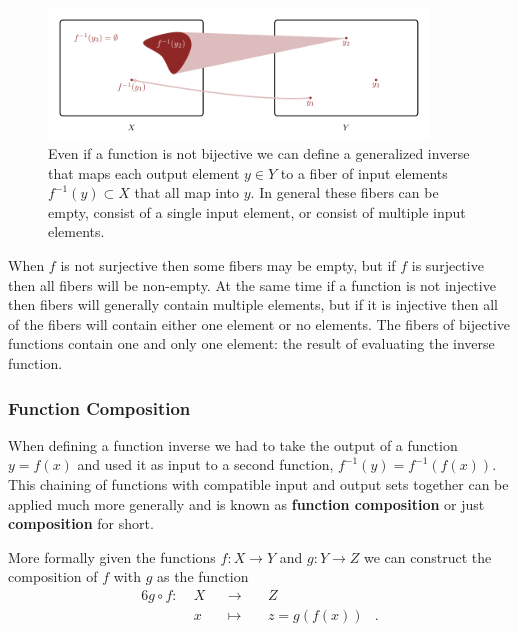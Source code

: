 \documentclass[
  letterpaper,
  DIV=11,
  numbers=noendperiod]{scrartcl}
\begin{document}
\begin{figure}

{\centering \includegraphics[width=0.9\textwidth,height=\textheight]{figures/maps/fibers/fibers.pdf}

}

\caption{\label{fig-fibers}Even if a function is not bijective we can
define a generalized inverse that maps each output element \(y \in Y\)
to a fiber of input elements \(f^{-1}(y) \subset X\) that all map into
\(y\). In general these fibers can be empty, consist of a single input
element, or consist of multiple input elements.}

\end{figure}

When \(f\) is not surjective then some fibers may be empty, but if \(f\)
is surjective then all fibers will be non-empty. At the same time if a
function is not injective then fibers will generally contain multiple
elements, but if it is injective then all of the fibers will contain
either one element or no elements. The fibers of bijective functions
contain one and only one element: the result of evaluating the inverse
function.

\hypertarget{function-composition}{%
\subsubsection{Function Composition}\label{function-composition}}

When defining a function inverse we had to take the output of a function
\(y = f(x)\) and used it as input to a second function,
\(f^{-1}(y) = f^{-1}(f(x))\). This chaining of functions with compatible
input and output sets together can be applied much more generally and is
known as \textbf{function composition} or just \textbf{composition} for
short.

More formally given the functions \(f : X \rightarrow Y\) and
\(g : Y \rightarrow Z\) we can construct the composition of \(f\) with
\(g\) as the function \begin{alignat*}{6}
g \circ f :\; & X & &\rightarrow& \; & Z &
\\
& x & &\mapsto& & z = g(f(x)) &.
\end{alignat*}
\end{document}
